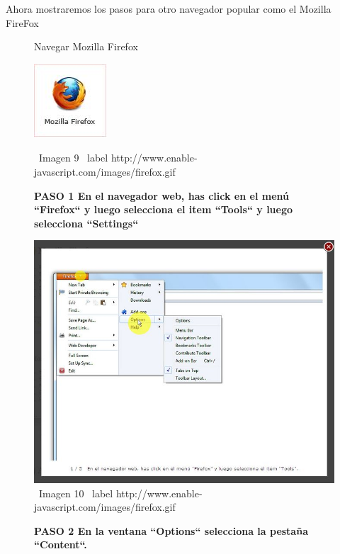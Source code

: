 \documentclass[11pt]{article} %
\begin{document}
Ahora mostraremos los pasos para otro navegador popular como el Mozilla FireFox
\newline
\begin{figure}
\begin{center}
\begin{center}
Navegar Mozilla Firefox

\end{center}
\begin{center}
\includegraphics[height=3 cm, width=3 cm] {imagenes/firefox.jpg}
\end{center}


\ Imagen 9
\ label {http://www.enable-javascript.com/images/firefox.gif }

\begin{center}
\bf PASO 1 
En el navegador web, has click en el menú ``Firefox`` y luego selecciona el item ``Tools``
y luego selecciona ``Settings``
\end{center}

\includegraphics[height=8 cm, width=8 cm] {imagenes/firefox 01.jpg}
\newline
\newline
\ Imagen 10
\ label {http://www.enable-javascript.com/images/firefox.gif }

\begin{center}
\bf PASO 2
En la ventana ``Options`` selecciona la pestaña ``Content``.
\end{center}


\end{center}
\end{figure}
\end{document}
